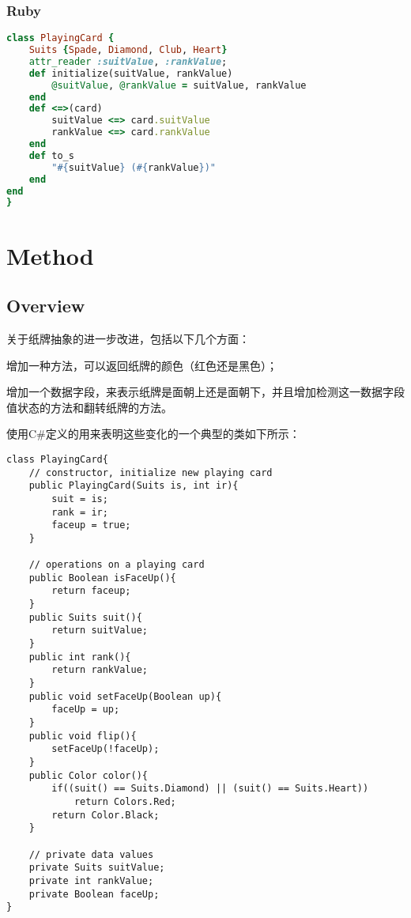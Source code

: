 \subsection{Ruby}



\begin{lstlisting}[language=Ruby]
class PlayingCard {
	Suits {Spade, Diamond, Club, Heart}
	attr_reader :suitValue, :rankValue;
	def initialize(suitValue, rankValue)
		@suitValue, @rankValue = suitValue, rankValue
	end
	def <=>(card)
		suitValue <=> card.suitValue
		rankValue <=> card.rankValue
	end
	def to_s
		"#{suitValue} (#{rankValue})"
	end
end
}
\end{lstlisting}





\chapter{Method}


\section{Overview}


关于纸牌抽象的进一步改进，包括以下几个方面：

\begin{compactitem}
\item 增加一种方法，可以返回纸牌的颜色（红色还是黑色）；
\item 增加一个数据字段，来表示纸牌是面朝上还是面朝下，并且增加检测这一数据字段值状态的方法和翻转纸牌的方法。
\end{compactitem}


使用C\#定义的用来表明这些变化的一个典型的类如下所示：

\begin{lstlisting}[language={[Sharp]C}]
class PlayingCard{
	// constructor, initialize new playing card
	public PlayingCard(Suits is, int ir){
		suit = is;
		rank = ir;
		faceup = true;
	}
	
	// operations on a playing card
	public Boolean isFaceUp(){
		return faceup;
	}
	public Suits suit(){
		return suitValue;
	}
	public int rank(){
		return rankValue;
	}
	public void setFaceUp(Boolean up){
		faceUp = up;
	}
	public void flip(){
		setFaceUp(!faceUp);
	}
	public Color color(){
		if((suit() == Suits.Diamond) || (suit() == Suits.Heart))
			return Colors.Red;
		return Color.Black;
	}
	
	// private data values
	private Suits suitValue;
	private int rankValue;
	private Boolean faceUp;
}
\end{lstlisting}



